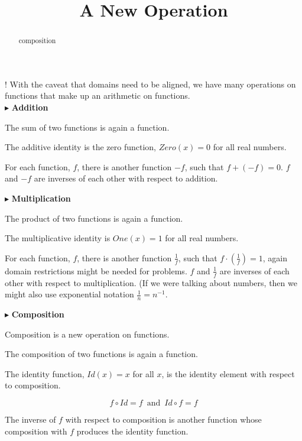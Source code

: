 \documentclass{ximera}
\title{A New Operation}
\begin{document}
\begin{abstract}
composition
\end{abstract}
\maketitle





{\Huge !} With the caveat that domains need to be aligned, we have many operations on functions that make up an arithmetic on functions. \\




$\blacktriangleright$ \textbf{\textcolor{blue!75!black}{Addition}}  

The sum of two functions is again a function. 

The additive identity is the zero function, $Zero(x) = 0$ for all real numbers.

For each function, $f$, there is another function $-f$, such that $f + (-f) = 0$.   $f$ and $-f$ are inverses of each other with respect to addition.




$\blacktriangleright$ \textbf{\textcolor{blue!75!black}{Multiplication}} 

The product of two functions is again a function.  

The multiplicative identity is $One(x) = 1$ for all real numbers.

For each function, $f$, there is another function $\frac{1}{f}$, such that $f \cdot \left( \frac{1}{f} \right) = 1$, again domain restrictions might be needed for problems.   $f$ and $\frac{1}{f}$ are inverses of each other with respect to multiplication.  (If we were talking about numbers, then we might also use exponential notation $\frac{1}{n} = n^{-1}$.


$\blacktriangleright$ \textbf{\textcolor{blue!75!black}{Composition}} 

Composition is a new operation on functions.

The composition of two functions is again a function. 

The identity function, $Id(x) = x$ for all $x$, is the identity element with respect to composition.



\[   f \circ Id = f    \, \text{ and } \, Id \circ f = f        \]



The inverse of $f$ with respect to composition is another function whose composition with $f$ produces the identity function.
\end{document}
